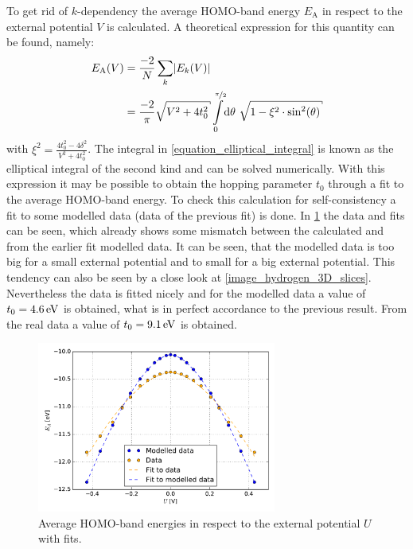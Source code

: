 To get rid of $k$-dependency the average HOMO-band energy $E_\text{A}$ in respect to the external potential $V$ is calculated. A theoretical expression for this quantity can be found, namely:
\begin{align}
	E_\text{A}(V) &= \frac{-2}{N}\sum_k \left|E_k(V)\right|\\
				  &= \frac{-2}{\pi}\sqrt{V^2+4t_0^2}\int\limits_0^{\nicefrac{\pi}{2}}\dd\theta\ \sqrt{1-\xi^2\cdot\sin^2(\theta)}
				  \label{equation_elliptical_integral}
\end{align}
with $\xi^2 = \frac{4t_0^2-4\delta^2}{V^2+4t_0^2}$. The integral in \cref{equation_elliptical_integral} is known as the elliptical integral of the second kind and can be solved numerically. With this expression it may be possible to obtain the hopping parameter $t_0$ through a fit to the average HOMO-band energy. To check this calculation for self-consistency a fit to some modelled data (data of the previous fit) is done. In \cref{image_hydrogen_homo_energy_charging} the data and fits can be seen, which already shows some mismatch between the calculated and from the earlier fit modelled data. It can be seen, that the modelled data is too big for a small external potential and to small for a big external potential. This tendency can also be seen by a close look at \cref{image_hydrogen_3D_slices}.\\
Nevertheless the data is fitted nicely and for the modelled data a value of $t_0 = \unit[4.6]{eV}$ is obtained, what is in perfect accordance to the previous result. From the real data a value of $t_0 = \unit[9.1]{eV}$ is obtained.\\
\begin{figure}[]
	\centering
	\includegraphics[width = 0.7\textwidth]{Images/Hydrogen/charging/Homo_energy_charge}
	\caption{Average HOMO-band energies in respect to the external potential $U$ with fits.}
	\label{image_hydrogen_homo_energy_charging}
\end{figure}
